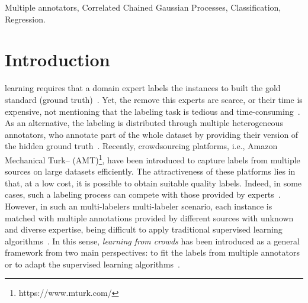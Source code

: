 \documentclass[journal]{IEEEtran}
\newcommand{\comment}[2]{{\color{blue}#1} {\color{red}#2}}
\begin{document}
\begin{IEEEkeywords}
Multiple annotators, Correlated Chained Gaussian Processes, Classification, Regression.
\end{IEEEkeywords}

%
\IEEEpeerreviewmaketitle



\section{Introduction}

 learning requires that a domain expert
labels the instances to built the gold standard (ground
truth)~\cite{zhang2019crowdsourced}. Yet, \comment{the}{remove this} experts are scarce, or
their time is expensive, not mentioning that the labeling task is
tedious and time-consuming~\cite{liu2020truth}. As an alternative, the
labeling is distributed through multiple heterogeneous annotators, who
annotate part of the whole dataset by providing their version of the
hidden ground truth~\cite{kara2015modeling}.  Recently, crowdsourcing
platforms, i.e., Amazon Mechanical Turk--
(AMT)\footnote{https://www.mturk.com/}, have been introduced to
capture labels from multiple sources on large datasets
efficiently. The attractiveness of these platforms lies in that, at a
low cost, it is possible to obtain suitable quality labels. Indeed, in
some cases, such a labeling process can compete with those provided by
experts~\cite{snow2008cheap}. However, in such \comment{an multi-labelers}{multi-labeler}
scenario, each instance is matched with multiple annotations provided
by different sources with unknown and diverse expertise, being
difficult to apply traditional supervised learning
algorithms~\cite{tao2018domain}. In this sense, \emph{learning from
  crowds} has been introduced as a general framework from two main
perspectives: to fit the labels from multiple annotators or to adapt
the supervised learning algorithms~\cite{rizos2020average}.
\end{document}
